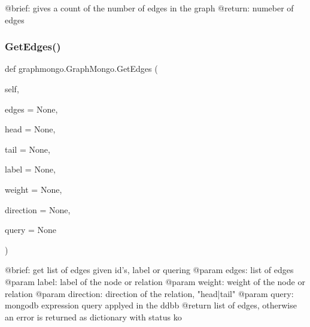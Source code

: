 \begin{DoxyVerb}@brief: gives a count of the number of edges in the graph
@return: numeber of edges
\end{DoxyVerb}
 \hypertarget{classgraphmongo_1_1GraphMongo_a4ead15bb7429e6261ba3ff04d8e0ad34}{}\label{classgraphmongo_1_1GraphMongo_a4ead15bb7429e6261ba3ff04d8e0ad34} 
\subsubsection{\texorpdfstring{Get\+Edges()}{GetEdges()}}
{\footnotesize\ttfamily def graphmongo.\+Graph\+Mongo.\+Get\+Edges (\begin{DoxyParamCaption}\item[{}]{self,  }\item[{}]{edges = {\ttfamily None},  }\item[{}]{head = {\ttfamily None},  }\item[{}]{tail = {\ttfamily None},  }\item[{}]{label = {\ttfamily None},  }\item[{}]{weight = {\ttfamily None},  }\item[{}]{direction = {\ttfamily None},  }\item[{}]{query = {\ttfamily None} }\end{DoxyParamCaption})}

\begin{DoxyVerb}@brief: get list of edges given id's, label or quering
@param edges: list of edges
@param label: label of the node or relation
@param weight: weight of the node or relation
@param direction: direction of the relation, "head|tail"
@param query: mongodb expression query applyed in the ddbb
@return list of edges, otherwise an error is returned as dictionary with status ko
\end{DoxyVerb}
 \hypertarget{classgraphmongo_1_1GraphMongo_ab820ea7237fd30bb51621800150e67d4}{}\label{classgraphmongo_1_1GraphMongo_ab820ea7237fd30bb51621800150e67d4} 
